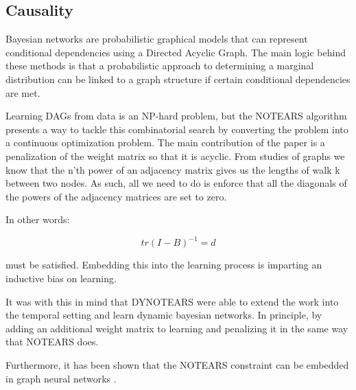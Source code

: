\documentclass{article}
\begin{document}





\subsection{Causality}

Bayesian networks are probabilistic graphical models that can represent conditional dependencies using a Directed Acyclic Graph. The main logic behind these methods is that a probabilistic approach to determining a marginal distribution can be linked to a graph structure if certain conditional dependencies are met. 

Learning DAGs from data is an NP-hard problem, but the NOTEARS algorithm \cite{zheng_dags_2018} presents a way to tackle this combinatorial search by converting the problem into a continuous optimization problem. The main contribution of the paper is a penalization of the weight matrix so that it is acyclic. From studies of graphs we know that the n'th power of an adjacency matrix gives us the lengths of walk k between two nodes. As such, all we need to do is enforce that all the diagonals of the powers of the adjacency matrices are set to zero. 

In other words:

$$ tr(I-B)^{-1} = d $$

must be satisfied. Embedding this into the learning process is imparting an inductive bias on learning. 

It was with this in mind that DYNOTEARS \cite{pamfil_dynotears_2020} were able to extend the work into the temporal setting and learn dynamic bayesian networks. In principle, by adding an additional weight matrix to learning and penalizing it in the same way that NOTEARS does.

Furthermore, it has been shown that the NOTEARS constraint can be embedded in graph neural networks \cite{lachapelle_gradient-based_2020,yu_dag-gnn_nodate}.
\end{document}
